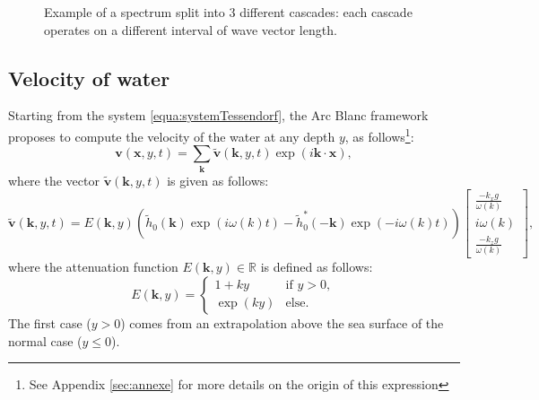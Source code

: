 \documentclass[final]{jcgt}
\def\framework{the Arc Blanc framework\xspace}
\begin{document}
\begin{figure}
	\centering
	
	\caption{Example of a spectrum split into $3$ different cascades: each cascade operates on a different interval of wave vector length.}
	\label{fig:cascades}
\end{figure}


\subsection{Velocity of water}
\label{subsec:velWater}
Starting from the system \ref{equa:systemTessendorf}, \framework proposes to compute the velocity of the water at any depth $y$, as follows\footnote{See Appendix   \ref{sec:annexe} for more details on the origin of this expression}:
\begin{equation}\label{equa:velocity}
	\mathbf v(\mathbf x,y,t)=
	\sum_{\mathbf{k}} \tilde{\mathbf{v}}(\mathbf{k}, y, t)\exp\left(i\mathbf{k}\cdot\mathbf x\right),
\end{equation}
where the vector $\tilde{\mathbf{v}}(\mathbf{k}, y, t)$ is given as follows:
\begin{equation}
	\tilde{\mathbf{v}}\left(\mathbf{k}, y, t\right)=%
	E\left(\mathbf{k},y\right)\left(\tilde{h}_0\left(\mathbf{k}\right)\exp\left({i\omega(k)t}\right)-\tilde{h}_0^*\left(-\mathbf{k}\right)\exp\left({-i\omega(k)t}\right)\right)
	\left[
		\begin{array}{c}
			\displaystyle\frac{-k_xg}{\omega(k)} \\
			\displaystyle i\omega(k)             \\
			\displaystyle\frac{-k_zg}{\omega(k)}
		\end{array}
		\right],
\end{equation}
where the attenuation function $E(\mathbf{k},y)\in\mathbb R$ is defined as follows:
\begin{equation}
	\label{equa:attenuationDeep}
	E(\mathbf{k}, y)=
	\begin{cases}
		1+ky     & \text{if }y>0, \\
		\exp(ky) & \text{else}.
	\end{cases}
\end{equation}
The first case ($y>0$) comes from an extrapolation above the sea surface of the normal case ($y\leq0$).
\end{document}
